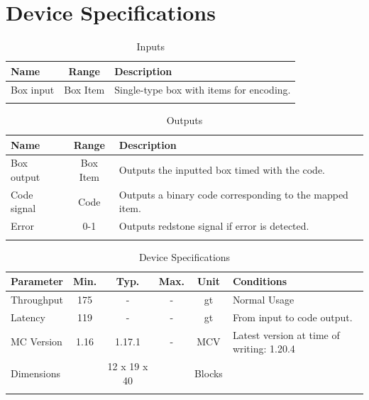 \documentclass[10pt]{datasheet}
\begin{document}
\onecolumn

\section{Device Specifications}

\begin{table}[h]
    \caption{Inputs}
    \begin{tabularx}{\textwidth}{l | c | X}
        \thickhline
        \textbf{Name} & \textbf{Range} & \textbf{Description} \\
        \hline
        Box input & Box Item & Single-type box with items for encoding. \\
        \thickhline
\end{tabularx}
\end{table}

\begin{table}[h]
    \caption{Outputs}
    \begin{tabularx}{\textwidth}{l | c | X}
        \thickhline
        \textbf{Name} & \textbf{Range} & \textbf{Description} \\
        \hline
        Box output & Box Item & Outputs the inputted box timed with the code. \\
        \hline
        Code signal & Code & Outputs a binary code corresponding to the mapped item. \\
        \hline
        Error & 0-1 & Outputs redstone signal if error is detected. \\
        \hline
        \thickhline
\end{tabularx}
\end{table}

\begin{table}[h]
    \caption{Device Specifications}
    \begin{tabularx}{\textwidth}{l | c c c | c | X}
        \thickhline
        \textbf{Parameter} & \textbf{Min.} & \textbf{Typ.} & \textbf{Max.} &
        \textbf{Unit} & \textbf{Conditions} \\
        \hline
        Throughput  & 175 & - & - & gt & Normal Usage \\
        \hline
        Latency    & 119 & - & - & gt & From input to code output. \\
        \hline
        MC Version & 1.16 & 1.17.1 & - & MCV & Latest version at time of writing: 1.20.4\\
        \hline
        Dimensions & & 12 x 19 x 40 & & Blocks & \\
        \thickhline
\end{tabularx}
\end{table}
\newpage
\end{document}
